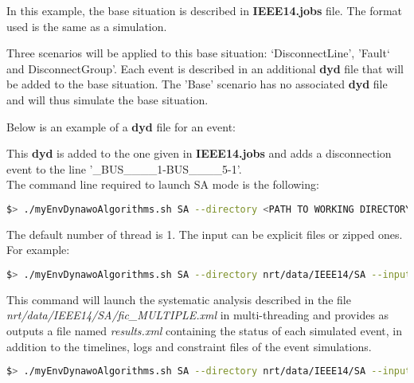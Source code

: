 \documentclass[a4paper, 12pt]{report}
\begin{document}


In this example, the base situation is described in \textbf{IEEE14.jobs} file. The format used is the same as a \Dynawo simulation.

Three scenarios will be applied to this base situation: `DisconnectLine', 'Fault` and DisconnectGroup'. 
Each event is described in an additional \textbf{dyd} file that will be added to the base situation. 
The 'Base' scenario has no associated \textbf{dyd} file and will thus simulate the base situation.

Below is an example of a \textbf{dyd} file for an event:



This \textbf{dyd} is added to the one given in \textbf{IEEE14.jobs} and adds a disconnection event to the line '\_BUS\_\_\_\_1-BUS\_\_\_\_5-1'.\\

The command line required to launch SA mode is the following:

\begin{lstlisting}[language=bash, breaklines=true, breakatwhitespace=false]
$> ./myEnvDynawoAlgorithms.sh SA --directory <PATH TO WORKING DIRECTORY> --input <NAME OF INPUT FILE> --output <NAME OF OUTPUT FILE> --nbThreads <NUMBER OF THREADS>
\end{lstlisting}

The default number of thread is 1. The input can be explicit files or zipped ones. For example:

\begin{lstlisting}[language=bash, breaklines=true, breakatwhitespace=false]
$> ./myEnvDynawoAlgorithms.sh SA --directory nrt/data/IEEE14/SA --input fic_MULTIPLE.xml --output results.xml --nbThreads 2
\end{lstlisting}

This command will launch the systematic analysis described in the file \textit{nrt/data/IEEE14/SA/fic\_MULTIPLE.xml} in multi-threading 
and provides as outputs a file named \textit{results.xml} containing the status of each simulated event, 
in addition to the timelines, logs and constraint files of the \Dynawo event simulations.\\

\begin{lstlisting}[language=bash, breaklines=true, breakatwhitespace=false]
$> ./myEnvDynawoAlgorithms.sh SA --directory nrt/data/IEEE14/SA --input inputs.zip --output outputs.zip
\end{lstlisting}
\end{document}
